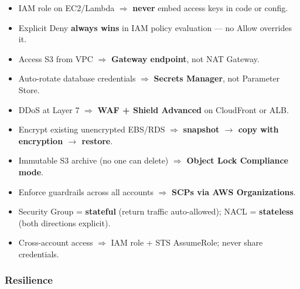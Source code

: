 \begin{keyfacts}
\begin{itemize}
  \item IAM role on EC2/Lambda $\Rightarrow$ \textbf{never} embed access keys in code or config.
  \item Explicit Deny \textbf{always wins} in IAM policy evaluation --- no Allow overrides it.
  \item Access S3 from VPC $\Rightarrow$ \textbf{Gateway endpoint}, not NAT Gateway.
  \item Auto-rotate database credentials $\Rightarrow$ \textbf{Secrets Manager}, not Parameter Store.
  \item DDoS at Layer 7 $\Rightarrow$ \textbf{WAF + Shield Advanced} on CloudFront or ALB.
  \item Encrypt existing unencrypted EBS/RDS $\Rightarrow$ \textbf{snapshot $\to$ copy with encryption $\to$ restore}.
  \item Immutable S3 archive (no one can delete) $\Rightarrow$ \textbf{Object Lock Compliance mode}.
  \item Enforce guardrails across all accounts $\Rightarrow$ \textbf{SCPs via AWS Organizations}.
  \item Security Group = \textbf{stateful} (return traffic auto-allowed); NACL = \textbf{stateless} (both directions explicit).
  \item Cross-account access $\Rightarrow$ IAM role + STS AssumeRole; never share credentials.
\end{itemize}
\end{keyfacts}

\subsubsection{Resilience}

